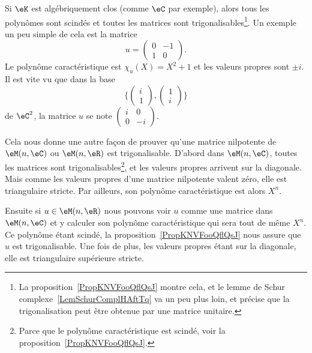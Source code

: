 \begin{remark}  \label{RemXFZTooXkGzQg}
	Si \( \eK\) est algébriquement clos (comme \( \eC\) par exemple), alors tous les polynômes sont scindés et toutes les matrices sont trigonalisables\footnote{La proposition~\ref{PropKNVFooQflQsJ} montre cela, et le lemme de Schur complexe~\ref{LemSchurComplHAftTq} va un peu plus loin, et précise que la trigonalisation peut être obtenue par une matrice unitaire.}. Un exemple un peu simple de cela est la matrice
	\begin{equation}
		u=\begin{pmatrix}
			0 & -1 \\
			1 & 0
		\end{pmatrix}.
	\end{equation}
	Le polynôme caractéristique est \( \chi_u(X)=X^2+1\) et les valeurs propres sont \( \pm i\). Il est vite vu que dans la base
	\begin{equation}
		\{ \begin{pmatrix}
			i \\
			1
		\end{pmatrix}, \begin{pmatrix}
			1 \\
			i
		\end{pmatrix}\}
	\end{equation}
	de \( \eC^2\), la matrice \( u\) se note \( \begin{pmatrix}
		i & 0  \\
		0 & -i
	\end{pmatrix}\).
\end{remark}

\begin{remark}  \label{RemREOSooGEDJWX}
	Cela nous donne une autre façon de prouver qu'une matrice nilpotente de \( \eM(n,\eC)\) ou \( \eM(n,\eR)\) est trigonalisable\cite{KDUFooVxwqlC}. D'abord dans \( \eM(n,\eC)\), toutes les matrices sont trigonalisables\footnote{Parce que le polynôme caractéristique est scindé, voir la proposition~\ref{PropKNVFooQflQsJ}.}, et les valeurs propres arrivent sur la diagonale. Mais comme les valeurs propres d'une matrice nilpotente valent zéro, elle est triangulaire stricte. Par ailleurs, son polynôme caractéristique est alors \( X^n\).

	Ensuite si \( u\in \eM(n,\eR)\) nous pouvons voir \( u\) comme une matrice dans \( \eM(n,\eC)\) et y calculer son polynôme caractéristique qui sera tout de même \( X^n\). Ce polynôme étant scindé, la proposition~\ref{PropKNVFooQflQsJ} nous assure que \( u\) est trigonalisable. Une fois de plus, les valeurs propres étant sur la diagonale, elle est triangulaire supérieure stricte.
\end{remark}

